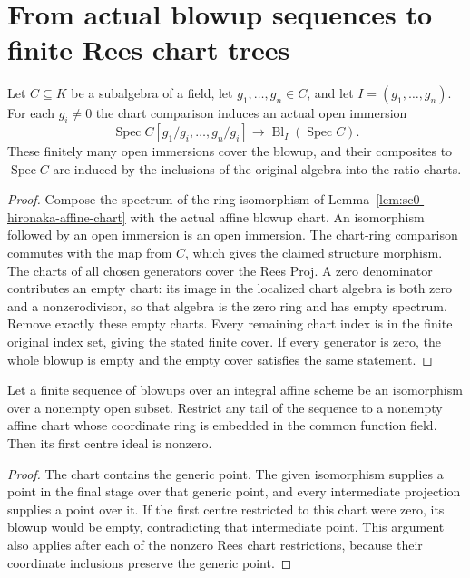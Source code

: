 \section{From actual blowup sequences to finite Rees chart trees}

\begin{lemma}\label{lem:sc0-actual-rees-chart-cover}
\leanok
{}
Let $C\subseteq K$ be a subalgebra of a field, let $g_1,\ldots,g_n\in C$, and let
$I=(g_1,\ldots,g_n)$. For each $g_i\ne0$ the chart comparison induces an actual open immersion
\[
 \operatorname{Spec} C[g_1/g_i,\ldots,g_n/g_i]\longrightarrow
 \operatorname{Bl}_I(\operatorname{Spec}C).
\]
These finitely many open immersions cover the blowup, and their composites to
$\operatorname{Spec}C$ are induced by the inclusions of the original algebra into the ratio charts.
\end{lemma}
\begin{proof}
Compose the spectrum of the ring isomorphism of
Lemma~\ref{lem:sc0-hironaka-affine-chart} with the actual affine blowup chart. An isomorphism
followed by an open immersion is an open immersion. The chart-ring comparison commutes with
the map from $C$, which gives the claimed structure morphism. The charts of all chosen
generators cover the Rees Proj. A zero denominator contributes an empty chart: its image in
the localized chart algebra is both zero and a nonzerodivisor, so that algebra is the zero ring
and has empty spectrum. Remove exactly these empty charts. Every remaining chart index is in
the finite original index set, giving the stated finite cover. If every generator is zero,
the whole blowup is empty and the empty cover satisfies the same statement.
\end{proof}

\begin{lemma}\label{lem:sc0-nonzero-chart-centre}
\notready
{}
Let a finite sequence of blowups over an integral affine scheme be an isomorphism over a
nonempty open subset. Restrict any tail of the sequence to a nonempty affine chart whose
coordinate ring is embedded in the common function field. Then its first centre ideal is nonzero.
\end{lemma}
\begin{proof}
The chart contains the generic point. The given isomorphism supplies a point in the final
stage over that generic point, and every intermediate projection supplies a point over it.
If the first centre restricted to this chart were zero, its blowup would be empty, contradicting
that intermediate point. This argument also applies after each of the nonzero Rees chart
restrictions, because their coordinate inclusions preserve the generic point.
\end{proof}

